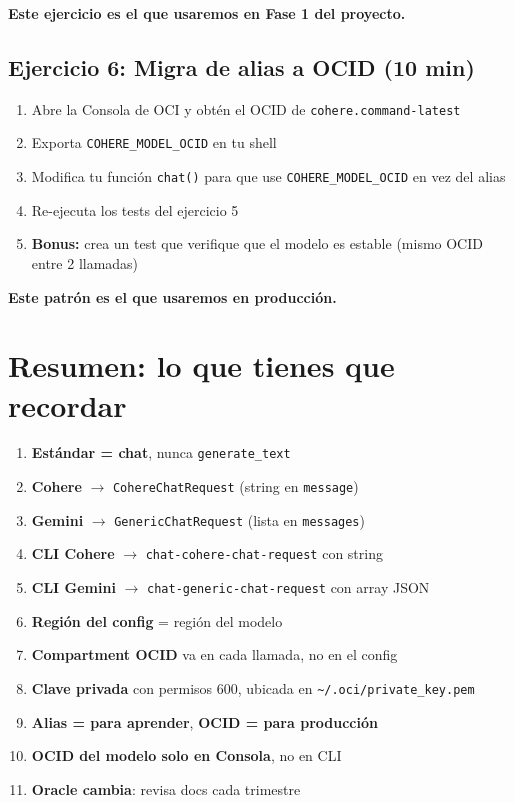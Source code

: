 \documentclass[11pt,a4paper,oneside]{article}
\begin{document}
\textbf{Este ejercicio es el que usaremos en Fase 1 del proyecto.}

\subsection{Ejercicio 6: Migra de alias a OCID (10 min)}

\begin{enumerate}
  \item Abre la Consola de OCI y obt\'en el OCID de \texttt{cohere.command-latest}
  \item Exporta \texttt{COHERE\_MODEL\_OCID} en tu shell
  \item Modifica tu funci\'on \texttt{chat()} para que use \texttt{COHERE\_MODEL\_OCID} en vez del alias
  \item Re-ejecuta los tests del ejercicio 5
  \item \textbf{Bonus:} crea un test que verifique que el modelo es estable (mismo OCID entre 2 llamadas)
\end{enumerate}

\textbf{Este patr\'on es el que usaremos en producci\'on.}

\section{Resumen: lo que tienes que recordar}

\begin{tcolorbox}[colback=okgreen!5!white,colframe=okgreen,title={\textbf{Checklist de memoria}}]
\begin{enumerate}
  \item \textbf{Est\'andar = chat}, nunca \texttt{generate\_text}
  \item \textbf{Cohere} $\rightarrow$ \texttt{CohereChatRequest} (string en \texttt{message})
  \item \textbf{Gemini} $\rightarrow$ \texttt{GenericChatRequest} (lista en \texttt{messages})
  \item \textbf{CLI Cohere} $\rightarrow$ \texttt{chat-cohere-chat-request} con string
  \item \textbf{CLI Gemini} $\rightarrow$ \texttt{chat-generic-chat-request} con array JSON
  \item \textbf{Regi\'on del config} = regi\'on del modelo
  \item \textbf{Compartment OCID} va en cada llamada, no en el config
  \item \textbf{Clave privada} con permisos 600, ubicada en \texttt{\textasciitilde/.oci/private\_key.pem}
  \item \textbf{Alias = para aprender}, \textbf{OCID = para producci\'on}
  \item \textbf{OCID del modelo solo en Consola}, no en CLI
  \item \textbf{Oracle cambia}: revisa docs cada trimestre
\end{enumerate}
\end{tcolorbox}
\end{document}
